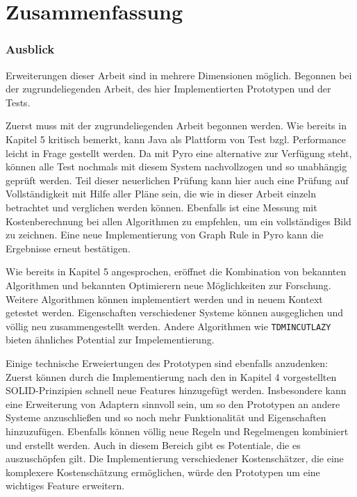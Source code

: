 \chapter{Zusammenfassung}




\subsection{Ausblick}

Erweiterungen dieser Arbeit sind in mehrere Dimensionen möglich. Begonnen bei der zugrundeliegenden Arbeit, des hier Implementierten Prototypen und der Tests.


Zuerst muss mit der zugrundeliegenden Arbeit begonnen werden. Wie bereits in Kapitel 5 kritisch bemerkt, kann Java als Plattform von Test bzgl. Performance leicht in Frage gestellt werden. Da mit Pyro eine alternative zur Verfügung steht, können alle Test nochmals mit diesem System nachvollzogen und so unabhängig geprüft werden. Teil dieser neuerlichen Prüfung kann hier auch eine Prüfung auf Vollständigkeit mit Hilfe aller Pläne sein, die wie in dieser Arbeit einzeln betrachtet und verglichen werden können. Ebenfalls ist eine Messung mit Kostenberechnung bei allen Algorithmen zu empfehlen, um ein vollständiges Bild zu zeichnen. Eine neue Implementierung von Graph Rule in Pyro kann die Ergebnisse erneut bestätigen.

Wie bereits in Kapitel 5 angesprochen, eröffnet die Kombination von bekannten Algorithmen und bekannten Optimierern neue Möglichkeiten zur Forschung. Weitere Algorithmen können implementiert werden und in neuem Kontext getestet werden. Eigenschaften verschiedener Systeme können ausgeglichen und völlig neu zusammengestellt werden. Andere Algorithmen wie \texttt{TDMINCUTLAZY} bieten ähnliches Potential zur Impelementierung.

Einige technische Erweiertungen des Prototypen sind ebenfalls anzudenken: Zuerst können durch die Implementierung nach den in Kapitel 4 vorgestellten SOLID-Prinzipien schnell neue Features hinzugefügt werden. Insbesondere kann eine Erweiterung von Adaptern sinnvoll sein, um so den Prototypen an andere Systeme anzuschließen und so noch mehr Funktionalität und Eigenschaften hinzuzufügen. Ebenfalls können völlig neue Regeln und Regelmengen kombiniert und erstellt werden. Auch in diesem Bereich gibt es Potentiale, die es auszuschöpfen gilt. Die Implementierung verschiedener Kostenschätzer, die eine komplexere Kostenschätzung ermöglichen, würde den Prototypen um eine wichtiges Feature erweitern. 

